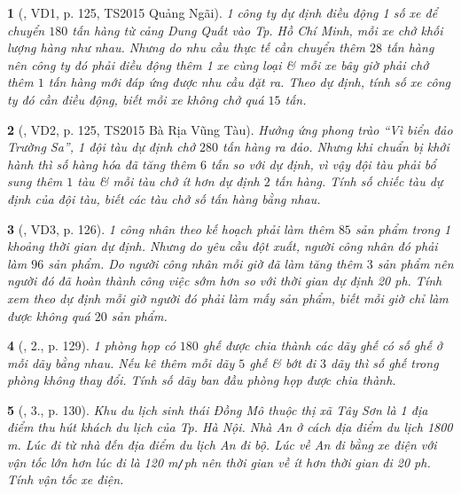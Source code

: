 \documentclass{article}
\newtheorem{baitoan}{}
\begin{document}
\begin{baitoan}[\cite{Kien_dai_so_9}, VD1, p. 125, TS2015 Quảng Ngãi]
	1 công ty dự định điều động 1 số xe để chuyển $180$ tấn hàng từ cảng Dung Quất vào Tp. Hồ Chí Minh, mỗi xe chở khối lượng hàng như nhau. Nhưng do nhu cầu thực tế cần chuyển thêm $28$ tấn hàng nên công ty đó phải điều động thêm 1 xe cùng loại \& mỗi xe bây giờ phải chở thêm $1$ tấn hàng mới đáp ứng được nhu cầu đặt ra. Theo dự định, tính số xe công ty đó cần điều động, biết mỗi xe không chở quá $15$ tấn.
\end{baitoan}

\begin{baitoan}[\cite{Kien_dai_so_9}, VD2, p. 125, TS2015 Bà Rịa Vũng Tàu]
	Hưởng ứng phong trào ``Vì biển đảo Trường Sa'', 1 đội tàu dự định chở $280$ tấn hàng ra đảo. Nhưng khi chuẩn bị khởi hành thì số hàng hóa đã tăng thêm $6$ tấn so với dự định, vì vậy đội tàu phải bổ sung thêm $1$ tàu \& mỗi tàu chở ít hơn dự định $2$ tấn hàng. Tính số chiếc tàu dự định của đội tàu, biết các tàu chở số tấn hàng bằng nhau.
\end{baitoan}

\begin{baitoan}[\cite{Kien_dai_so_9}, VD3, p. 126]
	1 công nhân theo kế hoạch phải làm thêm $85$ sản phẩm trong 1 khoảng thời gian dự định. Nhưng do yêu cầu đột xuất, người công nhân đó phải làm $96$ sản phẩm. Do người công nhân mỗi giờ đã làm tăng thêm $3$ sản phẩm nên người đó đã hoàn thành công việc sớm hơn so với thời gian dự định {\rm20 ph}. Tính xem theo dự định mỗi giờ người đó phải làm mấy sản phẩm, biết mỗi giờ chỉ làm được không quá $20$ sản phẩm.
\end{baitoan}

\begin{baitoan}[\cite{Kien_dai_so_9}, 2., p. 129]
	1 phòng họp có $180$ ghế được chia thành các dãy ghế có số ghế ở mỗi dãy bằng nhau. Nếu kê thêm mỗi dãy $5$ ghế \& bớt đi $3$ dãy thì số ghế trong phòng không thay đổi. Tính số dãy ban đầu phòng họp được chia thành.
\end{baitoan}

\begin{baitoan}[\cite{Kien_dai_so_9}, 3., p. 130]
	Khu du lịch sinh thái Đồng Mô thuộc thị xã Tây Sơn là 1 địa điểm thu hút khách du lịch của Tp. Hà Nội. Nhà An ở cách địa điểm du lịch {\rm1800 m}. Lúc đi từ nhà đến địa điểm du lịch An đi bộ. Lúc về An đi bằng xe điện với vận tốc lớn hơn lúc đi là {\rm120 m{\tt/}ph} nên thời gian về ít hơn thời gian đi {\rm20 ph}. Tính vận tốc xe điện.
\end{baitoan}
\end{document}
